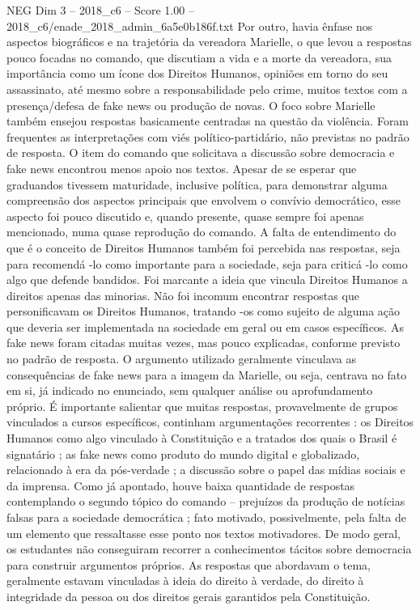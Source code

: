\begin{textsample}{NEG Dim 3 – 2018\_c6 – Score 1.00 – 2018\_c6/enade\_2018\_admin\_6a5e0b186f.txt}
Por outro, havia ênfase nos aspectos biográficos e na trajetória da vereadora Marielle, o que levou a respostas pouco focadas no comando, que discutiam a vida e a morte da vereadora, sua importância como um ícone dos Direitos Humanos, opiniões em torno do seu assassinato, até mesmo sobre a responsabilidade pelo crime, muitos textos com a presença/defesa de fake news ou produção de novas.
O foco sobre Marielle também ensejou respostas basicamente centradas na questão da violência.
Foram frequentes as interpretações com viés político-partidário, não previstas no padrão de resposta.
O item do comando que solicitava a discussão sobre democracia e fake news encontrou menos apoio nos textos.
Apesar de se esperar que graduandos tivessem maturidade, inclusive política, para demonstrar alguma compreensão dos aspectos principais que envolvem o convívio democrático, esse aspecto foi pouco discutido e, quando presente, quase sempre foi apenas mencionado, numa quase reprodução do comando.
A falta de entendimento do que é o conceito de Direitos Humanos também foi percebida nas respostas, seja para recomendá -lo como importante para a sociedade, seja para criticá -lo como algo que defende bandidos.
Foi marcante a ideia que vincula Direitos Humanos a direitos apenas das minorias.
Não foi incomum encontrar respostas que personificavam os Direitos Humanos, tratando -os como sujeito de alguma ação que deveria ser implementada na sociedade em geral ou em casos específicos.
As fake news foram citadas muitas vezes, mas pouco explicadas, conforme previsto no padrão de resposta.
O argumento utilizado geralmente vinculava as consequências de fake news para a imagem da Marielle, ou seja, centrava no fato em si, já indicado no enunciado, sem qualquer análise ou aprofundamento próprio.
É importante salientar que muitas respostas, provavelmente de grupos vinculados a cursos específicos, continham argumentações recorrentes : os Direitos Humanos como algo vinculado à Constituição e a tratados dos quais o Brasil é signatário ; as fake news como produto do mundo digital e globalizado, relacionado à era da pós-verdade ; a discussão sobre o papel das mídias sociais e da imprensa.
Como já apontado, houve baixa quantidade de respostas contemplando o segundo tópico do comando – prejuízos da produção de notícias falsas para a sociedade democrática ; fato motivado, possivelmente, pela falta de um elemento que ressaltasse esse ponto nos textos motivadores.
De modo geral, os estudantes não conseguiram recorrer a conhecimentos tácitos sobre democracia para construir argumentos próprios.
As respostas que abordavam o tema, geralmente estavam vinculadas à ideia do direito à verdade, do direito à integridade da pessoa ou dos direitos gerais garantidos pela Constituição.

\end{textsample}
